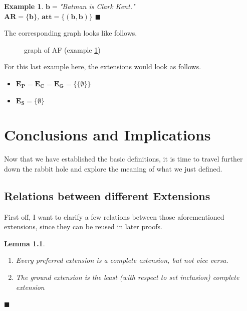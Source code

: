 \documentclass[12pt]{report}
\numberwithin{figure}{chapter}
\theoremstyle{break}
\newtheorem{exmpl}{Example}[chapter]
\newtheorem{lem}{Lemma}[chapter]
\newenvironment{myexmpl}{\begin{exmpl}}{$\blacksquare$ \end{exmpl}}
\newenvironment{mylem}{\begin{lem}}{$\blacksquare$ \end{lem}}
\begin{document}
\begin{myexmpl}
$\bm{b=}$"Batman is Clark Kent."\\
$\bm{AR=\{b\}}$, $\bm{att=\{(b,b)\}}$
\label{b loop ex}
\end{myexmpl}

The corresponding graph looks like follows.
\begin{figure}[h!]
\begin{center}\end{center}
\caption{graph of AF (example \ref{b loop ex})}
\end{figure}

For this last example here, the extensions would look as follows.
\begin{itemize}
	\item{$\bm{E_{P}=E_{C}=E_{G}=\{\{\emptyset\}\}}$}
	\item{$\bm{E_{S}=\{\emptyset\}}$}
\end{itemize}

\chapter{Conclusions and Implications}

Now that we have established the basic definitions, it is time to travel further down the rabbit hole and explore the meaning of what we just defined.

\section{Relations between different Extensions}
First off, I want to clarify a few relations between those aforementioned extensions, since they can be reused in later proofs.

\begin{mylem}
\leavevmode\vspace{-\baselineskip}
\begin{enumerate}
	\item{Every preferred extension is a complete extension, but not vice versa.}
	\item{The ground extension is the least (with respect to set inclusion) complete extension}
\end{enumerate}
\end{mylem}
\end{document}

